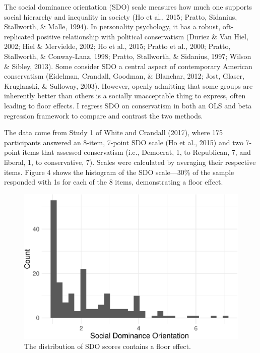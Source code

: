 \documentclass[english,,man]{apa6}
\begin{document}
The social dominance orientation (SDO) scale measures how much one supports social hierarchy and inequality in society (Ho et al., 2015; Pratto, Sidanius, Stallworth, \& Malle, 1994). In personality psychology, it has a robust, oft-replicated positive relationship with political conservatism (Duriez \& Van Hiel, 2002; Hiel \& Mervielde, 2002; Ho et al., 2015; Pratto et al., 2000; Pratto, Stallworth, \& Conway-Lanz, 1998; Pratto, Stallworth, \& Sidanius, 1997; Wilson \& Sibley, 2013). Some consider SDO a central aspect of contemporary American conservatism (Eidelman, Crandall, Goodman, \& Blanchar, 2012; Jost, Glaser, Kruglanski, \& Sulloway, 2003). However, openly admitting that some groups are inherently better than others is a socially unacceptable thing to express, often leading to floor effects. I regress SDO on conservatism in both an OLS and beta regression framework to compare and contrast the two methods.

The data come from Study 1 of White and Crandall (2017), where 175 participants answered an 8-item, 7-point SDO scale (Ho et al., 2015) and two 7-point items that assessed conservatism (i.e., Democrat, 1, to Republican, 7, and liberal, 1, to conservative, 7). Scales were calculated by averaging their respective items. Figure 4 shows the histogram of the SDO scale---30\% of the sample responded with 1s for each of the 8 items, demonstrating a floor effect.

\begin{figure}
\centering
\includegraphics{beta_hurdle_files/figure-latex/unnamed-chunk-11-1.pdf}
\caption{\label{fig:unnamed-chunk-11}The distribution of SDO scores contains a floor effect.}
\end{figure}
\end{document}
